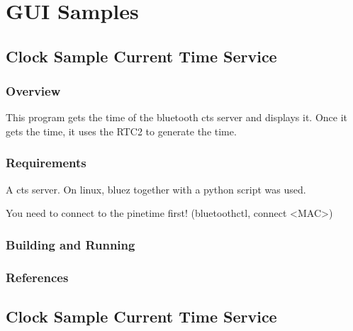 \documentclass[letterpaper,10pt,english]{sphinxmanual}
\begin{document}
\section{GUI Samples}
\label{\detokenize{samples/gui/gui:gui-samples}}\label{\detokenize{samples/gui/gui:id1}}\label{\detokenize{samples/gui/gui::doc}}

\subsection{Clock Sample Current Time Service}
\label{\detokenize{samples/gui/clock-cts-rtc2/README:clock-sample-current-time-service}}\label{\detokenize{samples/gui/clock-cts-rtc2/README:clock-sample-cts}}\label{\detokenize{samples/gui/clock-cts-rtc2/README::doc}}

\subsubsection{Overview}
\label{\detokenize{samples/gui/clock-cts-rtc2/README:overview}}
This program gets the time of the bluetooth cts server and displays it.
Once it gets the time, it uses the RTC2 to generate the time.


\subsubsection{Requirements}
\label{\detokenize{samples/gui/clock-cts-rtc2/README:requirements}}
A cts server.
On linux, bluez together with a python script was used.

You need to connect to the pinetime first!
(bluetoothctl, connect \textless{}MAC\textgreater{})


\subsubsection{Building and Running}
\label{\detokenize{samples/gui/clock-cts-rtc2/README:building-and-running}}

\subsubsection{References}
\label{\detokenize{samples/gui/clock-cts-rtc2/README:references}}

\subsection{Clock Sample Current Time Service}
\label{\detokenize{samples/gui/clock-cts/README:clock-sample-current-time-service}}\label{\detokenize{samples/gui/clock-cts/README:clock-sample-cts}}\label{\detokenize{samples/gui/clock-cts/README::doc}}
\end{document}
